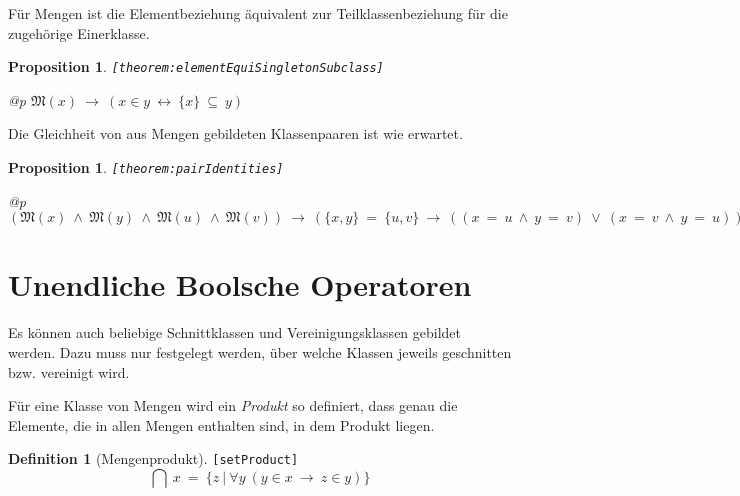 \documentclass[a4paper,german,10pt,twoside]{book}
\newtheorem{prop}[thm]{Proposition}
\theoremstyle{definition}
\newtheorem{defn}{Definition}
\theoremstyle{remark}
\begin{document}
\par
F{\"u}r Mengen ist die Elementbeziehung {\"a}quivalent zur Teilklassenbeziehung
f{\"u}r die zugeh{\"o}rige Einerklasse.

\begin{prop}
\label{theorem:elementEquiSingletonSubclass} \hypertarget{theorem:elementEquiSingletonSubclass}{}
{\tt \tiny [\verb]theorem:elementEquiSingletonSubclass]]}
\mbox{}
\begin{longtable}{{@{\extracolsep{\fill}}p{\linewidth}}}
\centering $\mathfrak{M}(x)\ \rightarrow\ (x \in y\ \leftrightarrow\ \{ x \} \ \subseteq \ y)$
\end{longtable}

\end{prop}


\par
Die Gleichheit von aus Mengen gebildeten Klassenpaaren ist wie erwartet.

\begin{prop}
\label{theorem:pairIdentities} \hypertarget{theorem:pairIdentities}{}
{\tt \tiny [\verb]theorem:pairIdentities]]}
\mbox{}
\begin{longtable}{{@{\extracolsep{\fill}}p{\linewidth}}}
\centering $(\mathfrak{M}(x)\ \land\ \mathfrak{M}(y)\ \land\ \mathfrak{M}(u)\ \land\ \mathfrak{M}(v))\ \rightarrow\ (\{ x, y \} \ = \ \{ u, v \}\ \rightarrow\ ((x \ = \ u\ \land\ y \ = \ v)\ \lor\ (x \ = \ v\ \land\ y \ = \ u)))$
\end{longtable}

\end{prop}


\section{Unendliche Boolsche Operatoren} \label{chapter4_section5} \hypertarget{chapter4_section5}{}
Es k{\"o}nnen auch beliebige Schnittklassen und Vereinigungsklassen gebildet werden. Dazu muss nur
festgelegt werden, {\"u}ber welche Klassen jeweils geschnitten bzw. vereinigt wird.

\par
F{\"u}r eine Klasse von Mengen wird ein \emph{Produkt} so definiert, dass genau die Elemente, 
die in allen Mengen enthalten sind, in dem Produkt liegen.

\begin{defn}[Mengenprodukt]
\label{setProduct} \hypertarget{setProduct}{}
{\tt \tiny [\verb]setProduct]]}
$$\bigcap \ x \ = \ \{ z \ | \ \forall y\ (y \in x\ \rightarrow\ z \in y) \} $$
\end{defn}
\end{document}
